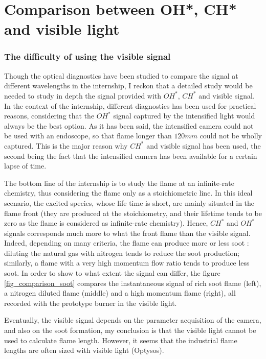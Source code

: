 \section{Comparison between OH*, CH* and visible light}
\subsubsection{The difficulty of using the visible signal}
Though the optical diagnostics have been studied to compare the signal at different wavelengths in the internship, I reckon that a detailed study would be needed to study in depth the signal provided with  $OH^*$, $CH^*$ and visible signal. In the context of the internship, different diagnostics has been used for practical reasons, considering that the $OH^*$ signal captured by the intensified light would always be the best option. As it has been said, the intensified camera could not be used with an endoscope, so that flame longer than $120 mm$ could not be wholly captured. This is the major reason why $CH^*$ and visible signal has been used, the second being the fact that the intensified camera has been available for a certain lapse of time.

The bottom line of the internship is to study the flame at an infinite-rate chemistry, thus considering the flame only as a stoichiometric line. In this ideal scenario, the excited species, whose life time is short, are mainly situated in the flame front (they are produced at the stoichiometry, and their lifetime tends to be zero as the flame is considered as infinite-rate chemistry). Hence, $CH^*$ and $OH^*$ signals corresponds much more to what the front flame than the visible signal. Indeed, depending on many criteria, the flame can produce more or less soot : diluting the natural gas with nitrogen tends to reduce the soot production; similarly, a flame with a very high momentum flow ratio tends to produce less soot. In order to show to what extent the signal can differ, the figure \ref{fig_comparison_soot} compares the instantaneous signal of rich soot flame (left), a nitrogen diluted flame (middle) and a high momentum flame (right), all recorded with the prototype burner in the visible light.

Eventually, the visible signal depends on the parameter acquisition of the camera, and also on the soot formation, my conclusion is that the visible light cannot be used to calculate flame length. However, it seems that the industrial flame lengths are often sized with visible light (Optysos). 


